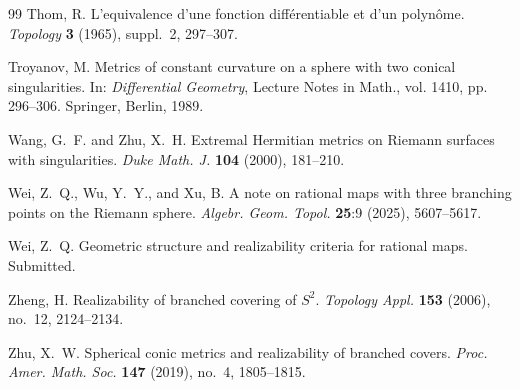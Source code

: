 \documentclass[microtype]{gtpart}     %
\theoremstyle{definition}
\begin{document}
\begin{thebibliography}{99}
Thom, R.
L'equivalence d'une fonction diff\'{e}rentiable et d'un polyn\^{o}me.
\textit{Topology} \textbf{3} (1965), suppl.~2, 297--307.

Troyanov, M.
Metrics of constant curvature on a sphere with two conical singularities.
In: \textit{Differential Geometry}, Lecture Notes in Math., vol. 1410, pp. 296--306. Springer, Berlin, 1989.

Wang, G.~F. and Zhu, X.~H.
Extremal Hermitian metrics on Riemann surfaces with singularities.
\textit{Duke Math. J.} \textbf{104} (2000), 181--210.

Wei, Z.~Q., Wu, Y.~Y., and Xu, B.
A note on rational maps with three branching points on the Riemann sphere.
\textit{Algebr. Geom. Topol.} \textbf{25}:9 (2025), 5607--5617.

Wei, Z.~Q.
Geometric structure and realizability criteria for rational maps. Submitted.

Zheng, H.
Realizability of branched covering of $S^{2}$.
\textit{Topology Appl.} \textbf{153} (2006), no.~12, 2124--2134.

Zhu, X.~W.
Spherical conic metrics and realizability of branched covers.
\textit{Proc. Amer. Math. Soc.} \textbf{147} (2019), no.~4, 1805--1815.

\end{thebibliography}
\end{document}
